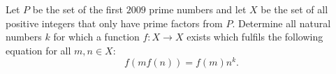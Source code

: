 Let $P$ be the set of the first $2009$ prime numbers and let $X$ be the set of all positive
integers that only have prime factors from $P$.
Determine all natural numbers $k$ for which a function $f\colon X \rightarrow X$
exists which fulfils the following equation for all $m,n \in X$:
$$f(mf(n))=f(m)n^k.$$
